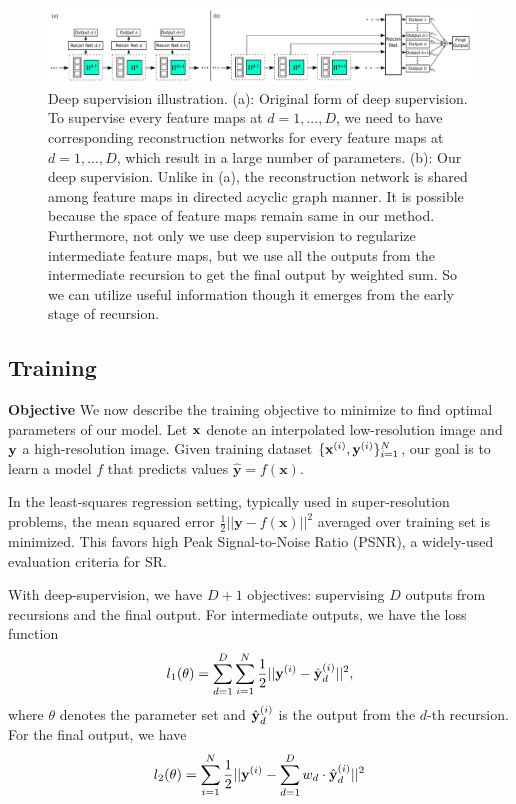 \documentclass[10pt,twocolumn,letterpaper]{article}
\begin{document}
\begin{figure}
\begin{center}
	\includegraphics[width=\textwidth]{figs/f3}
	\caption{Deep supervision illustration. (a): Original form of deep supervision. To supervise every feature maps at $d = 1, ..., D$, we need to have corresponding reconstruction networks for every feature maps at $d = 1, ..., D$, which result in a large number of parameters. (b): Our deep supervision. Unlike in (a), the reconstruction network is shared among feature maps in directed acyclic graph manner. It is possible because the space of feature maps remain same in our method. Furthermore, not only we use deep supervision to regularize intermediate feature maps, but we use all the outputs from the intermediate recursion to get the final output by weighted sum. So we can utilize useful information though it emerges from the early stage of recursion.}
\end{center}
\end{figure}

\subsection{Training}

\textbf{Objective} We now describe the training objective to minimize to find optimal parameters of our model. Let ${\bf x}$ denote an interpolated low-resolution image and ${\bf y}$ a high-resolution image. 
Given training dataset $\{{\bf x}^{(i)},{\bf y}^{(i)}\}{}_{i=1}^{N}$, our goal is to learn a model $f$ that predicts values $\mathbf{\hat{y}}=f(\mathbf{x})$.

In the least-squares regression setting, typically used in super-resolution
problems, the mean squared error $\frac{1}{2}||\mathbf{y}-f(\mathbf{x})||^{2}$
averaged over training set is minimized. This favors high Peak Signal-to-Noise
Ratio (PSNR), a widely-used evaluation criteria for SR. 

With deep-supervision, we have $D+1$ objectives: supervising $D$ outputs from recursions and the final output. For intermediate outputs, we have the loss function 
\begin{equation}
l_1(\theta) = \sum_{d=1}^D \sum_{i=1}^N \frac{1}{2}||{\bf y}^{(i)} -  \hat{\bf y}_d^{(i)} ||^{2},
\end{equation}
where $\theta$ denotes the parameter set and $\hat{\bf y}_d^{(i)}$ is the output from the $d$-th recursion. For the final output, we have 
\begin{equation}
l_2(\theta) = \sum_{i=1}^N \frac{1}{2}||{\bf y}^{(i)} -  \sum_{d=1}^D  w_d \cdot \hat{\bf y}_d^{(i)} ||^{2}
\end{equation}
\end{document}

